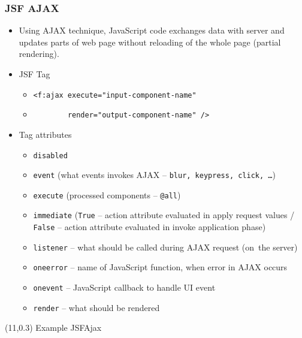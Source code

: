 \documentclass[10pt,xcolor=pdflatex]{beamer}
\begin{document}
\begin{frame}[fragile]\frametitle{JSF AJAX}
	\begin{itemize}
		\item Using AJAX technique, JavaScript code exchanges data with server and updates parts of web page without reloading of the whole page (partial rendering).
		\item JSF Tag
          \begin{itemize}
            \item[] {\footnotesize\verb'<f:ajax execute="input-component-name"'}
            \item[]	{\footnotesize\verb'        render="output-component-name" />'}
          \end{itemize}
        \item Tag attributes
          \begin{itemize}
        	\item \texttt{disabled}
        	\item \texttt{event} (what events invokes AJAX -- \texttt{blur, keypress, click, \ldots})
        	\item \texttt{execute} (processed components -- \texttt{@all})
        	\item \texttt{immediate} (\texttt{True} -- action attribute evaluated in apply request values / \texttt{False} -- action attribute evaluated in invoke application phase)
        	\item \texttt{listener} -- what should be called during AJAX request (on~the server)
        	\item \texttt{oneerror} -- name of JavaScript function, when error in AJAX occurs
        	\item \texttt{onevent} -- JavaScript callback to handle UI event
        	\item \texttt{render} -- what should be rendered
          \end{itemize}
	\end{itemize}
\begin{textblock}{10}(11,0.3)
    {\footnotesize Example JSFAjax}
\end{textblock}
\end{frame}
\end{document}
